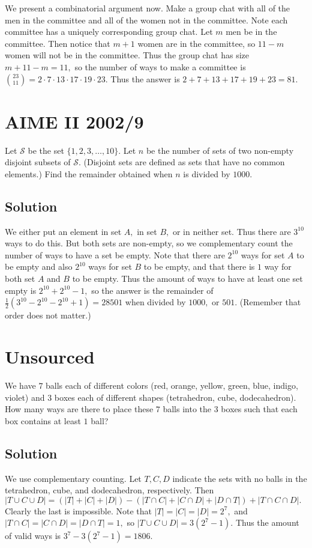 \documentclass{article}
\begin{document}
We present a combinatorial argument now. Make a group chat with all of the men in the committee and all of the women not in the committee. Note each committee has a uniquely corresponding group chat. Let $m$ men be in the committee. Then notice that $m+1$ women are in the committee, so $11-m$ women will not be in the committee. Thus the group chat has size $m+11-m=11,$ so the number of ways to make a committee is $\binom{23}{11}=2\cdot 7\cdot 13\cdot 17\cdot 19\cdot 23.$ Thus the answer is $2+7+13+17+19+23=81.$

\pagebreak\section{AIME II 2002/9}
Let $\mathcal{S}$ be the set $\lbrace1,2,3,\ldots,10\rbrace.$ Let $n$ be the number of sets of two non-empty disjoint subsets of $\mathcal{S}$. (Disjoint sets are defined as sets that have no common elements.) Find the remainder obtained when $n$ is divided by $1000$.

\subsection{Solution}
We either put an element in set $A,$ in set $B,$ or in neither set. Thus there are $3^{10}$ ways to do this. But both sets are non-empty, so we complementary count the number of ways to have a set be empty. Note that there are $2^{10}$ ways for set $A$ to be empty and also $2^{10}$ ways for set $B$ to be empty, and that there is $1$ way for both set $A$ and $B$ to be empty. Thus the amount of ways to have at least one set empty is $2^{10}+2^{10}-1,$ so the answer is the remainder of $\frac{1}{2}(3^{10}-2^{10}-2^{10}+1)=28501$ when divided by $1000,$ or $501.$ (Remember that order does not matter.)

\pagebreak\section{Unsourced}
We have $7$ balls each of different colors (red, orange, yellow, green, blue, indigo, violet) and $3$ boxes each of different shapes (tetrahedron, cube, dodecahedron). How many ways are there to place these $7$ balls into the $3$ boxes such that each box contains at least $1$ ball?

\subsection{Solution}
We use complementary counting. Let $T,C,D$ indicate the sets with no balls in the tetrahedron, cube, and dodecahedron, respectively. Then $|T\cup C\cup D|=(|T|+|C|+|D|)-(|T\cap C|+|C\cap D|+|D\cap T|)+|T\cap C\cap D|.$ Clearly the last is impossible. Note that $|T|=|C|=|D|=2^7,$ and $|T\cap C|=|C\cap D|=|D\cap T|=1,$ so $|T\cup C\cup D|=3(2^7-1).$ Thus the amount of valid ways is $3^7-3(2^7-1)=1806.$
\end{document}
